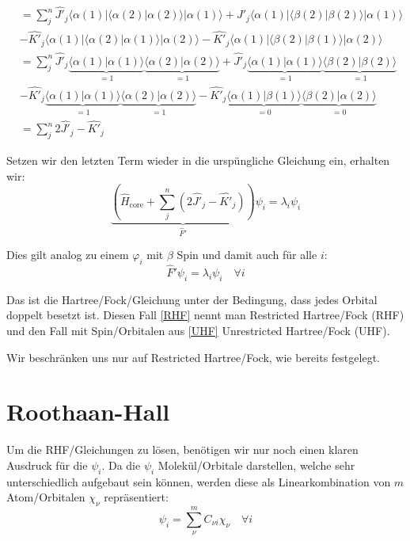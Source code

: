 \begin{align*}
  &=\sum_j^{n} 
  \hat{J'}_j \langle \alpha(1) \vert \langle \alpha(2) \vert \alpha(2) \rangle \vert \alpha(1) \rangle
  + \hat{J'}_j \langle \alpha(1) \vert \langle \beta(2) \vert \beta(2) \rangle \vert \alpha(1) \rangle\\
  &- \hat{K'}_j \langle \alpha(1) \vert \langle \alpha(2) \vert \alpha(1) \rangle \vert \alpha(2) \rangle
  - \hat{K'}_j \langle \alpha(1) \vert \langle \beta(2) \vert \beta(1) \rangle \vert \alpha(2) \rangle\\
  &=\sum_j^{n} 
  \hat{J'}_j \underbrace{\langle \alpha(1) \vert \alpha(1) \rangle}_{=1}
  \underbrace{\langle \alpha(2) \vert \alpha(2) \rangle}_{=1}
  + \hat{J'}_j \underbrace{\langle \alpha(1) \vert \alpha(1) \rangle}_{=1}
  \underbrace{\langle \beta(2) \vert \beta(2) \rangle}_{=1}\\
  &- \hat{K'}_j \underbrace{\langle \alpha(1) \vert \alpha(1) \rangle}_{=1}
  \underbrace{\langle \alpha(2) \vert \alpha(2) \rangle}_{=1}
  - \hat{K'}_j \underbrace{\langle \alpha(1) \vert \beta(1) \rangle}_{=0}
  \underbrace{\langle \beta(2) \vert \alpha(2) \rangle}_{=0}\\
  &=\sum_j^{n} 2\hat{J'}_j - \hat{K'}_j
\end{align*}

Setzen wir den letzten Term wieder in die urspüngliche Gleichung ein, erhalten wir:
\begin{equation*}
  \underbrace{\left( \hat{H}_{\text{core}} + \sum_j^{n}
  \left( 2\hat{J'}_j - \hat{K'}_j \right) \right)}_{\hat{F}'} \psi_i 
  = \lambda_i \psi_i
\end{equation*}

Dies gilt analog zu einem $\varphi_i$ mit $\beta$ Spin und damit auch für alle $i$:
\begin{equation}\label{RHF}
  \hat{F}' \psi_i = \lambda_i \psi_i\quad \forall i
\end{equation}

Das ist die Hartree\-/Fock\-/Gleichung unter der Bedingung, dass jedes Orbital doppelt besetzt ist.
Diesen Fall \cref{RHF} nennt man Restricted Hartree\-/Fock (RHF) und
den Fall mit Spin\-/Orbitalen aus \cref{UHF} Unrestricted Hartree\-/Fock (UHF).

Wir beschränken uns nur auf Restricted Hartree\-/Fock, wie bereits festgelegt.

\section{Roothaan-Hall}
Um die RHF\-/Gleichungen zu lösen, benötigen wir nur noch einen klaren Ausdruck für die $\psi_i$.
Da die $\psi_i$ Molekül\-/Orbitale darstellen, welche sehr unterschiedlich aufgebaut sein können,
werden diese als Linearkombination von $m$ Atom\-/Orbitalen $\chi_\nu$ repräsentiert:
\begin{equation}
  \psi_i = \sum_\nu^m C_{\nu i} \chi_\nu \quad \forall i 
\end{equation}

